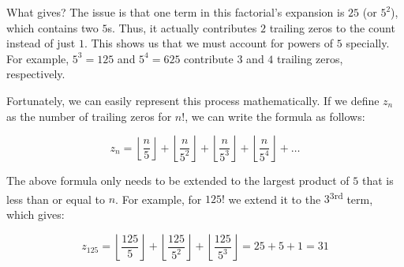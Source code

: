 \documentclass{article}
\def\lf{\left\lfloor}
\def\rf{\right\rfloor}
\begin{document}
What gives? The issue is that one term in this factorial's expansion 
is $25$ (or $5^2$), which contains two $5$s. Thus, it actually 
contributes $2$ trailing zeros to the count instead of just $1$. This 
shows us that we must account for powers of $5$ specially. For 
example, $5^3=125$ and $5^4=625$ contribute $3$ and $4$ trailing zeros, 
respectively.

Fortunately, we can easily represent this process mathematically. If 
we define $z_n$ as the number of trailing zeros for $n!$, we can write 
the formula as follows:

$$
z_n = \lf\frac{n}{5}\rf + \lf\frac{n}{5^2}\rf + 
\lf\frac{n}{5^3}\rf + \lf\frac{n}{5^4}\rf + \ldots
$$

The above formula only needs to be extended to the largest product 
of $5$ that is less than or equal to $n$. For example, for $125!$ 
we extend it to the $3$\textsuperscript{3rd} term, which gives:

$$
z_{125} = \lf\frac{125}{5}\rf + \lf\frac{125}{5^2}\rf + 
\lf\frac{125}{5^3}\rf = 25 + 5 + 1 = 31
$$
\end{document}
